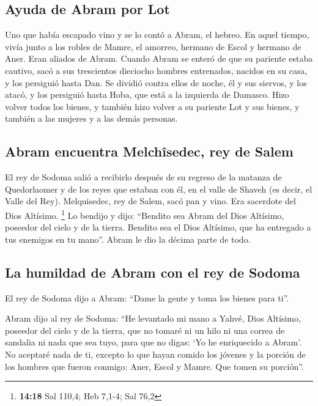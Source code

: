 \begin{paracol}{2}
{\subsection{Ayuda de Abram por Lot}\label{ayuda-de-abram-por-lot}}

 Uno que había escapado vino y se lo contó a Abram, el
hebreo. En aquel tiempo, vivía junto a los robles de Mamre, el amorreo,
hermano de Escol y hermano de Aner. Eran aliados de Abram.
 Cuando Abram se enteró de que su pariente estaba
cautivo, sacó a sus trescientos dieciocho hombres entrenados, nacidos en
su casa, y los persiguió hasta Dan.  Se dividió contra
ellos de noche, él y sus siervos, y los atacó, y los persiguió hasta
Hoba, que está a la izquierda de Damasco.  Hizo volver
todos los bienes, y también hizo volver a su pariente Lot y sus bienes,
y también a las mujeres y a las demás personas.

\hypertarget{abram-encuentra-melchuxeesedec-rey-de-salem}{%
\subsection{Abram encuentra Melchîsedec, rey de
Salem}\label{abram-encuentra-melchuxeesedec-rey-de-salem}}

 El rey de Sodoma salió a recibirlo después de su regreso
de la matanza de Quedorlaomer y de los reyes que estaban con él, en el
valle de Shaveh (es decir, el Valle del Rey). 
Melquisedec, rey de Salem, sacó pan y vino. Era sacerdote del Dios
Altísimo. \footnote{\textbf{14:18} Sal 110,4; Heb 7,1-4; Sal 76,2}
 Lo bendijo y dijo: ``Bendito sea Abram del Dios
Altísimo, poseedor del cielo y de la tierra.  Bendito sea
el Dios Altísimo, que ha entregado a tus enemigos en tu mano''. Abram le
dio la décima parte de todo.

\hypertarget{la-humildad-de-abram-con-el-rey-de-sodoma}{%
\subsection{La humildad de Abram con el rey de
Sodoma}\label{la-humildad-de-abram-con-el-rey-de-sodoma}}

 El rey de Sodoma dijo a Abram: ``Dame la gente y toma
los bienes para ti''.

 Abram dijo al rey de Sodoma: ``He levantado mi mano a
Yahvé, Dios Altísimo, poseedor del cielo y de la tierra, 
que no tomaré ni un hilo ni una correa de sandalia ni nada que sea tuyo,
para que no digas: `Yo he enriquecido a Abram'.  No
aceptaré nada de ti, excepto lo que hayan comido los jóvenes y la
porción de los hombres que fueron conmigo: Aner, Escol y Mamre. Que
tomen su porción''.


\end{paracol}
